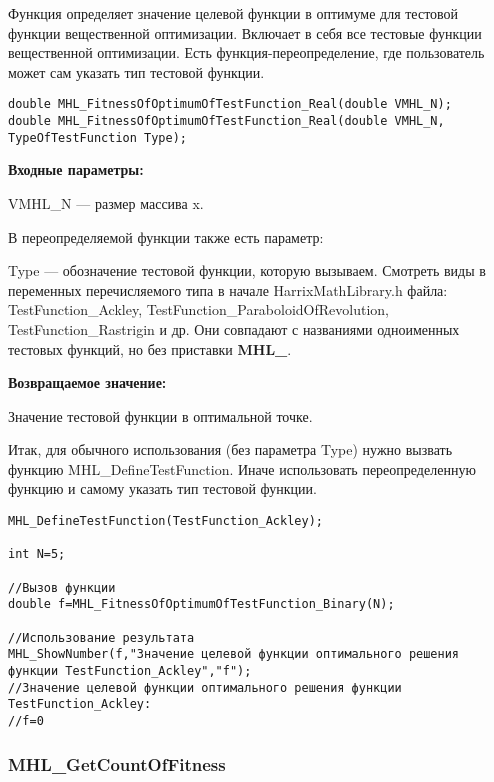 \documentclass[a4paper,12pt]{article}
\begin{document}
Функция определяет значение целевой функции в оптимуме для тестовой функции вещественной оптимизации. Включает в себя все тестовые функции вещественной оптимизации. Есть функция-переопределение, где пользователь может сам указать тип тестовой функции.


\begin{lstlisting}[label=code_syntax_MHL_FitnessOfOptimumOfTestFunction_Real,caption=Синтаксис]
double MHL_FitnessOfOptimumOfTestFunction_Real(double VMHL_N);
double MHL_FitnessOfOptimumOfTestFunction_Real(double VMHL_N, TypeOfTestFunction Type);
\end{lstlisting}

\textbf{Входные параметры:}

VMHL\_N --- размер массива x.

В переопределяемой функции также есть параметр:
  
Type --- обозначение тестовой функции, которую вызываем.
Смотреть виды в переменных перечисляемого типа в начале HarrixMathLibrary.h файла: TestFunction\_Ackley, TestFunction\_ParaboloidOfRevolution, TestFunction\_Rastrigin и др. Они совпадают с названиями одноименных тестовых функций, но без приставки \textbf{MHL\_}.

\textbf{Возвращаемое значение:}
 
Значение тестовой функции в оптимальной точке.

Итак, для обычного использования (без параметра Type) нужно вызвать функцию MHL\_DefineTestFunction. Иначе использовать переопределенную функцию и самому указать тип тестовой функции.


\begin{lstlisting}[label=code_use_MHL_FitnessOfOptimumOfTestFunction_Real,caption=Пример использования]
MHL_DefineTestFunction(TestFunction_Ackley);

int N=5;

//Вызов функции
double f=MHL_FitnessOfOptimumOfTestFunction_Binary(N);

//Использование результата
MHL_ShowNumber(f,"Значение целевой функции оптимального решения функции TestFunction_Ackley","f");
//Значение целевой функции оптимального решения функции TestFunction_Ackley:
//f=0
\end{lstlisting}

\subsubsection{MHL\_GetCountOfFitness}\label{MHL_GetCountOfFitness}
\end{document}
